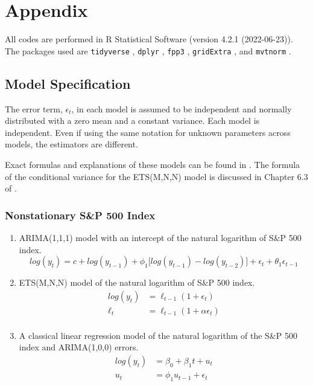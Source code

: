 \documentclass{monashthesis}
\begin{document}
\hypertarget{appendix}{%
\chapter{Appendix}\label{appendix}}

All codes are performed in R Statistical Software (version 4.2.1 (2022-06-23)). The packages used are \texttt{tidyverse} \autocite{tidy19}, \texttt{dplyr} \autocite{dplyr23}, \texttt{fpp3} \autocite{fpp23}, \texttt{gridExtra} \autocite{gridExtra}, and \texttt{mvtnorm} \autocite{GBMMLSH21}.

\hypertarget{model-specification}{%
\section{Model Specification}\label{model-specification}}

The error term, \(\epsilon_t\), in each model is assumed to be independent and normally distributed with a zero mean and a constant variance. Each model is independent. Even if using the same notation for unknown parameters across models, the estimators are different.

Exact formulas and explanations of these models can be found in \textcite{fpp3}. The formula of the conditional variance for the ETS(M,N,N) model is discussed in Chapter 6.3 of \textcite{HKOS08}.

\hypertarget{nonstationary-sp-500-index}{%
\subsection{Nonstationary S\&P 500 Index}\label{nonstationary-sp-500-index}}

\begin{enumerate}
\def\labelenumi{\arabic{enumi}.}
\item
  ARIMA(1,1,1) model with an intercept of the natural logarithm of S\&P 500 index.
  \begin{equation*}
  log(y_t) = c + log(y_{t-1}) + \phi_1\big[log(y_{t-1})-log(y_{t-2})\big] + \epsilon_t + \theta_1\epsilon_{t-1}
  \end{equation*}
\item
  ETS(M,N,N) model of the natural logarithm of S\&P 500 index.
  \begin{align*}
  log(y_t) &= \ell_{t-1} (1+\epsilon_t) \\
  \ell_t &= \ell_{t-1} (1+\alpha \epsilon_t) \\
  \end{align*}
\item
  A classical linear regression model of the natural logarithm of the S\&P 500 index and ARIMA(1,0,0) errors.
  \begin{align*}
  log(y_t) &= \beta_0 + \beta_1 t + u_t \\
  u_t &= \phi_1 u_{t-1} + \epsilon_t
  \end{align*}
\end{enumerate}
\end{document}
